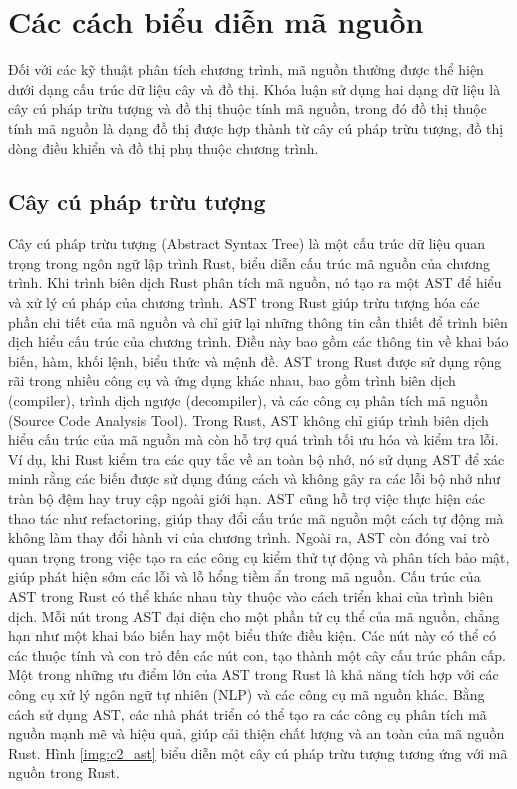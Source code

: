 \section{Các cách biểu diễn mã nguồn}

Đối với các kỹ thuật phân tích chương trình, mã nguồn thường được thể hiện dưới dạng cấu trúc dữ liệu cây và đồ thị.
Khóa luận sử dụng hai dạng dữ liệu là cây cú pháp trừu tượng và đồ thị thuộc tính mã nguồn, trong đó đồ thị thuộc tính mã nguồn là dạng đồ thị được hợp thành từ cây cú pháp trừu tượng, đồ thị dòng điều khiển và đồ thị phụ thuộc chương trình.

\subsection{Cây cú pháp trừu tượng}

Cây cú pháp trừu tượng (Abstract Syntax Tree) \cite{zhang2019novel} là một cấu trúc dữ liệu quan trọng trong ngôn ngữ lập trình Rust, biểu diễn cấu trúc mã nguồn của chương trình.
Khi trình biên dịch Rust phân tích mã nguồn, nó tạo ra một AST để hiểu và xử lý cú pháp của chương trình.
AST trong Rust giúp trừu tượng hóa các phần chi tiết của mã nguồn và chỉ giữ lại những thông tin cần thiết để trình biên dịch hiểu cấu trúc của chương trình.
Điều này bao gồm các thông tin về khai báo biến, hàm, khối lệnh, biểu thức và mệnh đề.
AST trong Rust được sử dụng rộng rãi trong nhiều công cụ và ứng dụng khác nhau, bao gồm trình biên dịch (compiler), trình dịch ngược (decompiler), và các công cụ phân tích mã nguồn (Source Code Analysis Tool).
Trong Rust, AST không chỉ giúp trình biên dịch hiểu cấu trúc của mã nguồn mà còn hỗ trợ quá trình tối ưu hóa và kiểm tra lỗi.
Ví dụ, khi Rust kiểm tra các quy tắc về an toàn bộ nhớ, nó sử dụng AST để xác minh rằng các biến được sử dụng đúng cách và không gây ra các lỗi bộ nhớ như tràn bộ đệm hay truy cập ngoài giới hạn.
AST cũng hỗ trợ việc thực hiện các thao tác như refactoring, giúp thay đổi cấu trúc mã nguồn một cách tự động mà không làm thay đổi hành vi của chương trình.
Ngoài ra, AST còn đóng vai trò quan trọng trong việc tạo ra các công cụ kiểm thử tự động và phân tích bảo mật, giúp phát hiện sớm các lỗi và lỗ hổng tiềm ẩn trong mã nguồn.
Cấu trúc của AST trong Rust có thể khác nhau tùy thuộc vào cách triển khai của trình biên dịch.
Mỗi nút trong AST đại diện cho một phần tử cụ thể của mã nguồn, chẳng hạn như một khai báo biến hay một biểu thức điều kiện.
Các nút này có thể có các thuộc tính và con trỏ đến các nút con, tạo thành một cây cấu trúc phân cấp.
Một trong những ưu điểm lớn của AST trong Rust là khả năng tích hợp với các công cụ xử lý ngôn ngữ tự nhiên (NLP) và các công cụ mã nguồn khác.
Bằng cách sử dụng AST, các nhà phát triển có thể tạo ra các công cụ phân tích mã nguồn mạnh mẽ và hiệu quả, giúp cải thiện chất lượng và an toàn của mã nguồn Rust.
Hình \ref{img:c2_ast} biểu diễn một cây cú pháp trừu tượng tương ứng với mã nguồn trong Rust.

